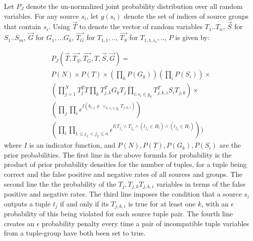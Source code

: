\documentclass{sig-alternate}
\newcounter{prob}
\begin{document}
Let $P_J$ denote the un-normalized joint probability distribution over all random variables. For any source $s_i$, let $g(s_i)$ denote the set of indices of source groups that contain $s_i$. 
Using $\overrightarrow{T}$ to denote the vector of random variables $T_1..T_n$, $\overrightarrow{S}$ for $S_1..S_m$, $\overrightarrow{G}$ for $G_1, ... G_k$,  $\overrightarrow{T_G}$ for $T_{1, 1}, ..$, $\overrightarrow{T_S}$ for $T_{1, 1, i_1}, ..$, $P$ is given by:

\begin{align*} 
& P_J(\overrightarrow{T}, \overrightarrow{T_S}, \overrightarrow{T_G}, T, \overrightarrow{S}, \overrightarrow{G}) =
\\& P(N) \times P(T) \times (\prod_{k} P(G_k)) (\prod_{i} P(S_i)) \times
\\& (\prod_{j=1}^{N} T_{j}^{T}T \prod_{k} T_{j, k}^{T}G_kT_j \prod_{i:s_i\in g_k} T_{j,k,i}^{T}S_iT_{j,k}) \times 
\\& (\prod_{j} \prod_{i} \epsilon^{I(b_{i,j} \neq \lor_{k : s_i \in g_k} T_{j,k,i})})
\\& (\prod_{l} \prod_{1 \leq j_1 < j_2 \leq n} \epsilon^{I(T_{j_1} \land T_{j_2} \land (t_{j_1}\in H_l) \land (t_{j_2} \in H_l)}))
\end{align*}
where $I$ is an indicator function, and $P(N), P(T), P(G_k), P(S_i)$ are the prior probabilities. The first line in the above formula for probability is the product of prior probability densities for the number of tuples, for a tuple being correct and the false positive and negative rates of all sources and groups. The second line the the probability of the $T_j, T_{j,k} T_{j,k,i}$ variables in terms of the false positive and negative rates. The third line imposes the condition that a source $s_i$ outputs a tuple $t_j$ if and only if its $T_{j,k,i}$ is true for at least one $k$, with an $\epsilon$ probability of this being violated for each source tuple pair. The fourth line creates an $\epsilon$ probability penalty every time a pair of incompatible tuple variables from a tuple-group have both been set to true.
\end{document}
